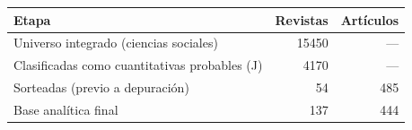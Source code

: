 \begin{tabular}{lrr}
\toprule
Etapa & Revistas & Artículos\\
\midrule
Universo integrado (ciencias sociales) & 15450 & —\\
Clasificadas como cuantitativas probables (J) & 4170 & —\\
Sorteadas (previo a depuración) & 54 & 485\\
Base analítica final & 137 & 444\\
\bottomrule
\end{tabular}
